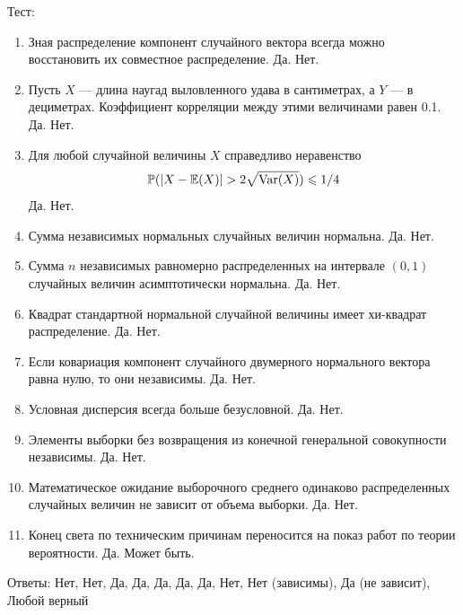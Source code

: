 \documentclass[12pt, a4paper]{article}\usepackage[]{graphicx}\usepackage[]{color}
\begin{document}
Тест:

\begin{enumerate}
\item Зная распределение компонент случайного вектора всегда можно восстановить их совместное распределение. Да. Нет.
\item Пусть $X$ — длина наугад выловленного удава в сантиметрах, а $Y$ — в дециметрах. Коэффициент корреляции между этими величинами равен 0.1. Да. Нет.
\item Для любой случайной величины $X$ справедливо неравенство
\[ \P(|X-\E(X)|>2\sqrt{\Var(X)})\leq 1/4 \]
Да. Нет.
\item Сумма независимых нормальных случайных величин нормальна. Да. Нет.
\item  Сумма $n$ независимых равномерно распределенных на интервале $(0,1)$ случайных величин асимптотически нормальна. Да. Нет.
\item Квадрат стандартной нормальной случайной величины имеет хи-квадрат распределение. Да. Нет.
\item Если ковариация компонент случайного двумерного нормального вектора равна нулю, то они независимы. Да. Нет.
\item Условная дисперсия всегда больше безусловной. Да. Нет.
\item Элементы выборки без возвращения из конечной генеральной совокупности независимы. Да. Нет.
\item Математическое ожидание выборочного среднего одинаково распределенных случайных величин не зависит от объема выборки. Да. Нет.
\item Конец света по техническим причинам переносится на показ работ по теории вероятности. Да. Может быть.
\end{enumerate}

Ответы: Нет, Нет, Да, Да, Да, Да, Да, Нет, Нет (зависимы), Да (не зависит), Любой верный
\end{document}

